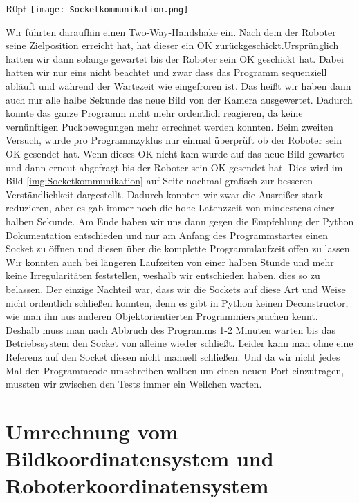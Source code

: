 \begin{wrapfigure}{R}{0pt}
	\vspace{-15pt}
	\texttt{[image: Socketkommunikation.png]}
	\vspace{-15pt}
	\caption{ Veranschaulichung der Socketkommunikation}
	\vspace{-15pt}
	\label{img:Socketkommunikation}
\end{wrapfigure}
Wir führten daraufhin einen Two-Way-Handshake ein. Nach dem der Roboter seine Zielposition erreicht hat, hat dieser ein OK zurückgeschickt.Ursprünglich hatten wir dann solange gewartet bis der Roboter sein OK geschickt hat. Dabei hatten wir nur eins nicht beachtet und zwar dass das Programm sequenziell abläuft und während der Wartezeit wie eingefroren ist. Das heißt wir haben dann auch nur alle halbe Sekunde das neue Bild von der Kamera ausgewertet. Dadurch konnte das ganze Programm nicht mehr ordentlich reagieren, da keine vernünftigen Puckbewegungen mehr errechnet werden konnten. Beim zweiten Versuch, wurde pro Programmzyklus nur einmal überprüft ob der Roboter sein OK gesendet hat. Wenn dieses OK nicht kam wurde auf das neue Bild gewartet und dann erneut abgefragt bis der Roboter sein OK gesendet hat. Dies wird im Bild \ref{img:Socketkommunikation} auf Seite \pageref{img:Socketkommunikation} nochmal grafisch zur besseren Verständlichkeit dargestellt. Dadurch konnten wir zwar die Ausreißer stark reduzieren, aber es gab immer noch die hohe Latenzzeit von mindestens einer halben Sekunde. Am Ende haben wir uns dann gegen die Empfehlung der Python Dokumentation entschieden und nur am Anfang des Programmstartes einen Socket zu öffnen und diesen über die komplette Programmlaufzeit offen zu lassen. Wir konnten auch bei längeren Laufzeiten von einer halben Stunde und mehr keine Irregularitäten feststellen, weshalb wir entschieden haben, dies so zu belassen. Der einzige Nachteil war, dass wir die Sockets auf diese Art und Weise nicht ordentlich schließen konnten, denn es gibt in Python keinen Deconstructor, wie man ihn aus anderen Objektorientierten Programmiersprachen kennt. Deshalb muss man nach Abbruch des Programms 1-2 Minuten warten bis das Betriebssystem den Socket von alleine wieder schließt. Leider kann man ohne eine Referenz auf den Socket diesen nicht manuell schließen. Und da wir nicht jedes Mal den Programmcode umschreiben wollten um einen neuen Port einzutragen, mussten wir zwischen den Tests immer ein Weilchen warten.

\pagebreak
\section{Umrechnung vom Bildkoordinatensystem und Roboterkoordinatensystem}

